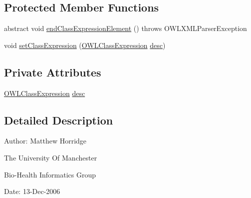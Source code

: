 \subsection*{Protected Member Functions}
\begin{DoxyCompactItemize}
\item 
abstract void \hyperlink{classorg_1_1coode_1_1owlapi_1_1owlxmlparser_1_1_abstract_class_expression_element_handler_a0812d9b8ccf8f81054bd9dda4e0d7403}{end\-Class\-Expression\-Element} ()  throws O\-W\-L\-X\-M\-L\-Parser\-Exception
\item 
void \hyperlink{classorg_1_1coode_1_1owlapi_1_1owlxmlparser_1_1_abstract_class_expression_element_handler_a2693c439a7c0c8696715584528709f5d}{set\-Class\-Expression} (\hyperlink{interfaceorg_1_1semanticweb_1_1owlapi_1_1model_1_1_o_w_l_class_expression}{O\-W\-L\-Class\-Expression} \hyperlink{classorg_1_1coode_1_1owlapi_1_1owlxmlparser_1_1_abstract_class_expression_element_handler_abac226ad839ac476bf2d1955f45c989d}{desc})
\end{DoxyCompactItemize}
\subsection*{Private Attributes}
\begin{DoxyCompactItemize}
\item 
\hyperlink{interfaceorg_1_1semanticweb_1_1owlapi_1_1model_1_1_o_w_l_class_expression}{O\-W\-L\-Class\-Expression} \hyperlink{classorg_1_1coode_1_1owlapi_1_1owlxmlparser_1_1_abstract_class_expression_element_handler_abac226ad839ac476bf2d1955f45c989d}{desc}
\end{DoxyCompactItemize}


\subsection{Detailed Description}
Author\-: Matthew Horridge\par
 The University Of Manchester\par
 Bio-\/\-Health Informatics Group\par
 Date\-: 13-\/\-Dec-\/2006\par
 \par
 

